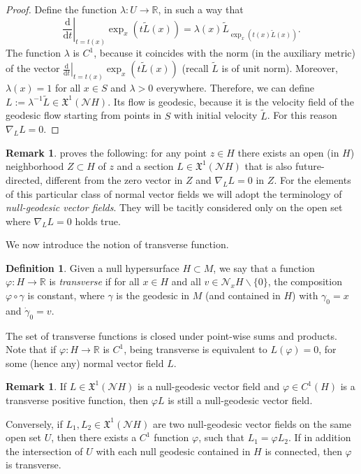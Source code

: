 \documentclass[12pt,a4paper]{amsart}
\theoremstyle{plain}
\theoremstyle{definition}
\newtheorem{definition}[lemma]{Definition}
\newtheorem{remark}[lemma]{Remark}
\numberwithin{equation}{section}
\newcommand{\R}{\mathbb{R}}
\newcommand{\de}{{\mathrm{d}}}
\newcommand{\vfield}{\mathfrak{X}}
\newcommand{\normal}{\mathscr{N}}
\begin{document}
\begin{proof}
  Define the function $\lambda:U\to \R$, in such a way that
  \begin{equation}
    \left.\frac{\de}{\de t}\right|_{t=t(x)}
    \exp_x(t\tilde L(x))
    =
    \lambda(x)
    \tilde L_{\exp_x(t(x)\tilde L(x))}
    .
  \end{equation}
  The function $\lambda$ is $C^1$, because it coincides
  with the norm (in the auxiliary metric) of the vector
  $\left.\frac{\de}{\de t}\right|_{t=t(x)} \exp_x(t\tilde L(x))$ (recall $\tilde L$ is of unit norm).
  Moreover, $\lambda(x)=1$ for all $x\in S$ and $\lambda>0$
  everywhere.
  Therefore,  we can define
  $L:=\lambda^{-1} \tilde L\in\vfield^1(\normal H)$.
  Its flow is geodesic, because it is the velocity field of the
  geodesic flow starting from points in $S$ with initial velocity
  $\tilde L$.
  For this reason $\nabla_L L=0$.
\end{proof}



\begin{remark}\label{R:nullgeodesic}
 proves the following: for any point $z \in H$ 
there exists an open (in $H$) neighborhood $Z \subset H$ of $z$
and a section $L\in \vfield^1(\normal H)$ that is also future-directed, different from the zero vector in $Z$
and $\nabla_L L = 0$ in $Z$.
For the elements of this particular class of normal vector fields we will adopt the terminology  of  \emph{null-geodesic vector fields}.
%
They will be tacitly considered only on the open set where $\nabla_L L = 0$ holds true.
\end{remark}









We now introduce the notion of transverse function.
\begin{definition}\label{D:transverse}
  Given a null hypersurface $H\subset M$, we say that a function $\varphi :H\to\R$ is
  \emph{transverse} if for all $x\in H$ and all $v\in \normal_x H\backslash \{0\}$,
  the composition $\varphi \circ \gamma$ is constant, where $\gamma$ is the
  geodesic in $M$ (and contained in $H$)  with $\gamma_0=x$ and $\dot \gamma_0=v$.
\end{definition}
%
The set of transverse functions is closed under point-wise sums and products.
%
Note that if $\varphi:H\to \R$ is $C^1$, being transverse is equivalent
to $L(\varphi)=0$, for some (hence any) normal vector field $L$.
%
\begin{remark}
  \label{R:change-null-geodesics}
  If $L\in\vfield^1(\normal H)$ is a null-geodesic vector field and
  $\varphi\in C^1(H)$ is a transverse positive function, then $\varphi L$ is still a
  null-geodesic vector field.

  Conversely, if $L_1,L_2\in \vfield^1(\normal H)$ are two null-geodesic vector fields on the same open set $U$, then there exists a 
  $C^1$ function $\varphi$, such that $L_1=\varphi L_2$.
 If in addition the intersection of $U$ with each null geodesic contained in $H$ is connected, then $\varphi$ is transverse.
 \end{remark}
\end{document}
